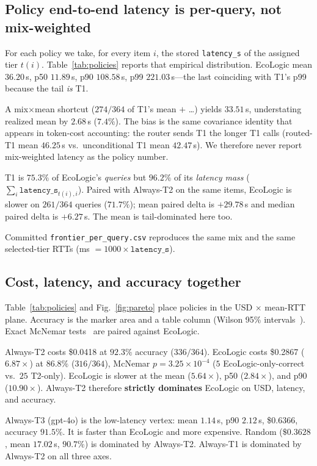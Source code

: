 \documentclass[10pt,conference]{IEEEtran}
\begin{document}
\subsection{Policy end-to-end latency is per-query, not mix-weighted}
\label{sec:perquery}
For each policy we take, for every item $i$, the stored \texttt{latency\_s} of the assigned tier $t(i)$. Table~\ref{tab:policies} reports that empirical distribution. EcoLogic mean $36.20$\,s, p50 $11.89$\,s, p90 $108.58$\,s, p99 $221.03$\,s---the last coinciding with T1's p99 because the tail \emph{is} T1.

A mix$\times$mean shortcut ($274/364$ of T1's mean $+$ \ldots) yields $33.51$\,s, understating realized mean by $2.68$\,s ($7.4\%$). The bias is the same covariance identity that appears in token-cost accounting: the router sends T1 the longer T1 calls (routed-T1 mean $46.25$\,s vs.\ unconditional T1 mean $42.47$\,s). We therefore never report mix-weighted latency as the policy number.

T1 is $75.3\%$ of EcoLogic's \emph{queries} but $96.2\%$ of its \emph{latency mass} ($\sum_i \texttt{latency\_s}_{t(i),i}$). Paired with Always-T2 on the same items, EcoLogic is slower on $261/364$ queries ($71.7\%$); mean paired delta is $+29.78$\,s and median paired delta is $+6.27$\,s. The mean is tail-dominated here too.

Committed \texttt{frontier\_per\_query.csv} reproduces the same mix and the same selected-tier RTTs (ms $= 1000\times\texttt{latency\_s}$).

\subsection{Cost, latency, and accuracy together}
Table~\ref{tab:policies} and Fig.~\ref{fig:pareto} place policies in the USD $\times$ mean-RTT plane. Accuracy is the marker area and a table column (Wilson 95\% intervals~\cite{wilson1927}). Exact McNemar tests~\cite{mcnemar1947} are paired against EcoLogic.

Always-T2 costs \$0.0418 at $92.3\%$ accuracy ($336/364$). EcoLogic costs \$0.2867 ($6.87\times$) at $86.8\%$ ($316/364$), McNemar $p{=}3.25\times 10^{-4}$ ($5$ EcoLogic-only-correct vs.\ $25$ T2-only). EcoLogic is slower at the mean ($5.64\times$), p50 ($2.84\times$), and p90 ($10.90\times$). Always-T2 therefore \textbf{strictly dominates} EcoLogic on USD, latency, and accuracy.

Always-T3 (gpt-4o) is the low-latency vertex: mean $1.14$\,s, p90 $2.12$\,s, \$0.6366, accuracy $91.5\%$. It is faster than EcoLogic and more expensive. Random ($\$0.3628$, mean $17.02$\,s, $90.7\%$) is dominated by Always-T2. Always-T1 is dominated by Always-T2 on all three axes.
\end{document}
